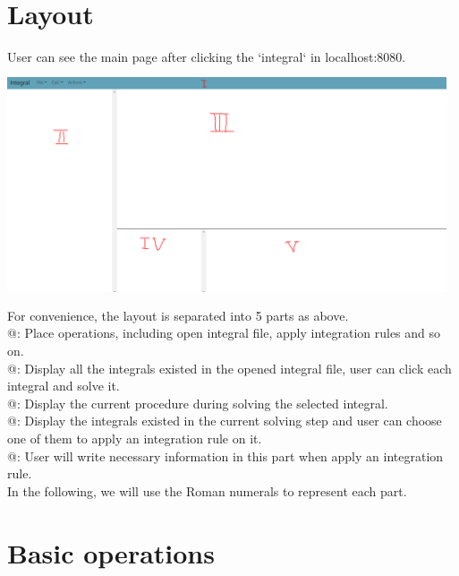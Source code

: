 \documentclass[titlepage]{article}
\makeatletter
\newcommand*{\rom}[1]{\expandafter\@slowromancap\romannumeral #1@}
\makeatother
\begin{document}
\section{Layout}
User can see the main page after clicking the `integral` in \colorbox{mygray}{localhost:8080}.\\
\includegraphics[width=13cm, height=7cm]{2.png}\\
For convenience, the layout is separated into 5 parts as above.\\
\rom{1}: Place operations, including open integral file, apply integration rules and so on.\\
\rom{2}: Display all the integrals existed in the opened integral file, user can click each integral and solve it.\\
\rom{3}: Display the current procedure during solving the selected integral.\\
\rom{4}: Display the integrals existed in the current solving step and user can choose one of them to apply an integration rule on it.\\
\rom{5}: User will write necessary information in this part when apply an integration rule. \\
In the following, we will use the Roman numerals to represent each part.
\section{Basic operations}
\end{document}
